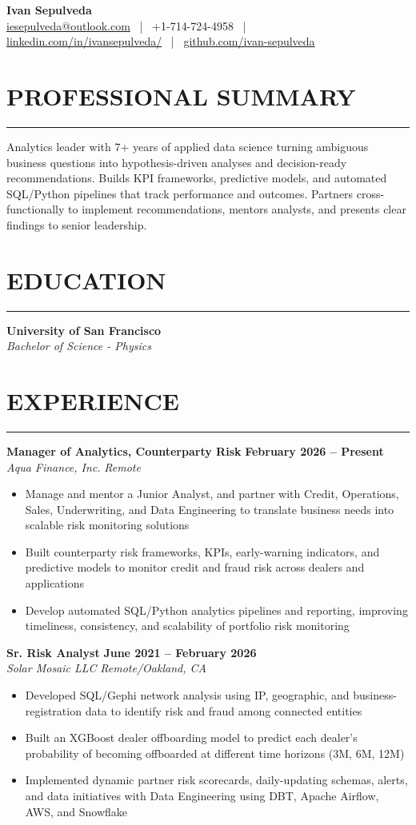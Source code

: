 \documentclass[10.5pt,letterpaper]{article}
\newcommand{\ressection}[1]{%
	\vspace{1.5mm}
	\section*{#1}
	\vspace{0.5mm}
	\hrule
	\vspace{1mm}
}
\newenvironment{myitemize}
{ \begin{itemize}[label={\textbullet}, leftmargin=*, topsep=1pt, partopsep=0pt, itemsep=1pt, parsep=0pt] }
	{ \end{itemize}                  }
\begin{document}
\begin{center}
	{\LARGE \textbf{Ivan Sepulveda}}\\[3pt]
	\href{mailto:iesepulveda@outlook.com}{iesepulveda@outlook.com} ~|~ +1-714-724-4958 ~|~ \href{https://www.linkedin.com/in/ivansepulveda/}{linkedin.com/in/ivansepulveda/} ~|~ \href{https://github.com/ivan-sepulveda}{github.com/ivan-sepulveda}
\end{center}

\ressection{PROFESSIONAL SUMMARY}
Analytics leader with 7+ years of applied data science turning ambiguous business questions into hypothesis-driven analyses and decision-ready recommendations. Builds KPI frameworks, predictive models, and automated SQL/Python pipelines that track performance and outcomes. Partners cross-functionally to implement recommendations, mentors analysts, and presents clear findings to senior leadership.

\ressection{EDUCATION}
\noindent\textbf{University of San Francisco} \\
\textit{Bachelor of Science - Physics}

\ressection{EXPERIENCE}

\noindent\textbf{Manager of Analytics, Counterparty Risk} \hfill \textbf{February 2026 -- Present} \\
\textit{Aqua Finance, Inc.} \hfill \textit{Remote}
\begin{myitemize}
	\item Manage and mentor a Junior Analyst, and partner with Credit, Operations, Sales, Underwriting, and Data Engineering to translate business needs into scalable risk monitoring solutions
	\item Built counterparty risk frameworks, KPIs, early-warning indicators, and predictive models to monitor credit and fraud risk across dealers and applications
	\item Develop automated SQL/Python analytics pipelines and reporting, improving timeliness, consistency, and scalability of portfolio risk monitoring
\end{myitemize}

\noindent\textbf{Sr. Risk Analyst} \hfill \textbf{June 2021 -- February 2026} \\
\textit{Solar Mosaic LLC} \hfill \textit{Remote/Oakland, CA}
\begin{myitemize}
	\item Developed SQL/Gephi network analysis using IP, geographic, and business-registration data to identify risk and fraud among connected entities
	\item Built an XGBoost dealer offboarding model to predict each dealer's probability of becoming offboarded at different time horizons (3M, 6M, 12M)
	\item Implemented dynamic partner risk scorecards, daily-updating schemas, alerts, and data initiatives with Data Engineering using DBT, Apache Airflow, AWS, and Snowflake
\end{myitemize}
\end{document}
